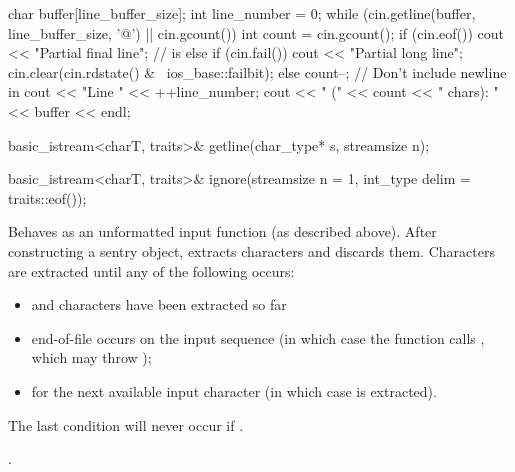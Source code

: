 \begin{itemdescr}
\begin{example}
\begin{codeblock}
{  char buffer[line_buffer_size];
  int line_number = 0;
  while (cin.getline(buffer, line_buffer_size, '@\textbackslash@n') || cin.gcount()) {
    int count = cin.gcount();
    if (cin.eof())
      cout << "Partial final line";     //  is 
    else if (cin.fail()) {
      cout << "Partial long line";
      cin.clear(cin.rdstate() & ~ios_base::failbit);
    } else {
      count--;                          // Don't include newline in 
      cout << "Line " << ++line_number;
    }
    cout << " (" << count << " chars): " << buffer << endl;
  }
}
\end{codeblock}
\end{example}
\end{itemdescr}

%
\begin{itemdecl}
basic_istream<charT, traits>& getline(char_type* s, streamsize n);
\end{itemdecl}

\begin{itemdescr}
\pnum
\returns
{}
\end{itemdescr}

%
\begin{itemdecl}
basic_istream<charT, traits>& ignore(streamsize n = 1, int_type delim = traits::eof());
\end{itemdecl}

\begin{itemdescr}
\pnum
\effects
Behaves as an unformatted input function
(as described above).
After constructing a sentry object, extracts
characters and discards them.
Characters are extracted until any of the following occurs:
\begin{itemize}
\item
{}
and
 characters have been extracted so far
\item
end-of-file occurs on the input sequence
(in which case the function calls
,
which may throw
);
\item
{}
for the next available input character 
(in which case  is extracted).
\end{itemize}

\pnum
\remarks
The last condition will never occur if
.

\pnum
\returns
{}.
\end{itemdescr}

